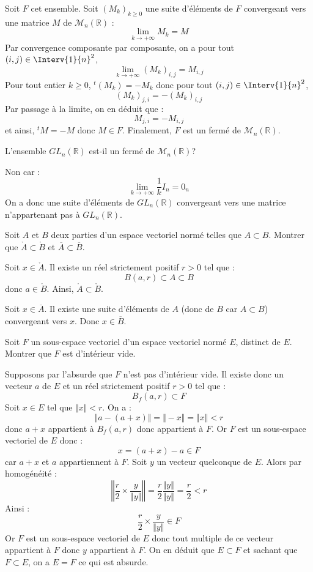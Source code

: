 \documentclass[a4paper,10pt]{report}
\begin{document}
\corr Soit $F$ cet ensemble. Soit $(M_k)_{k \geq 0}$ une suite d'éléments de $F$ convergeant vers une matrice $M$ de $\mathcal{M}_n(\mathbb{R})$ :
$$ \lim_{k \rightarrow + \infty} M_k = M$$
Par convergence composante par composante, on a pour tout $(i,j) \in \Interv{1}{n}^2$,
$$  \lim_{k \rightarrow + \infty} (M_k)_{i,j} = M_{i,j}$$
Pour tout entier $k \geq 0$, $^t(M_k)=-M_k$ donc pour tout $(i,j) \in \Interv{1}{n}^2$,
$$ (M_k)_{j,i} = - (M_k)_{i,j}$$
Par passage à la limite, on en déduit que :
$$ M_{j,i}=-M_{i,j}$$
et ainsi, $^t M=-M$ donc $M \in F$. Finalement, $F$ est un fermé de $\mathcal{M}_n(\mathbb{R})$.

\begin{Exa} L'ensemble $GL_n(\mathbb{R})$ est-il un fermé de $\mathcal{M}_n(\mathbb{R})$?
\end{Exa} 

\corr Non car :
$$ \lim_{k \rightarrow + \infty} \dfrac{1}{k} I_n = 0_n$$
On a donc une suite d'éléments de $GL_n(\mathbb{R})$ convergeant vers une matrice n'appartenant pas à $GL_n(\mathbb{R})$.


\begin{Exa} Soit $A$ et $B$ deux parties d'un espace vectoriel normé telles que $A \subset B$. Montrer que $\mathring{A} \subset \mathring{B}$ et $\overline{A} \subset \overline{B}$.
\end{Exa}

\corr Soit $x \in \mathring{A}$. Il existe un réel strictement positif $r>0$ tel que :
$$ B(a,r) \subset A \subset B$$
donc $a \in  \mathring{B}$. Ainsi, $\mathring{A} \subset \mathring{B}$.

\medskip

\noindent Soit $x \in \overline{A}$. Il existe une suite d'éléments de $A$ (donc de $B$ car $A \subset B$) convergeant vers $x$. Donc $x \in \overline{B}$.


\begin{Exa}[\ding{80}] Soit $F$ un sous-espace vectoriel d'un espace vectoriel normé $E$, distinct de $E$. Montrer que $F$ est d'intérieur vide.
\end{Exa}

\corr Supposons par l'absurde que $F$ n'est pas d'intérieur vide. Il existe donc un vecteur $a$ de $E$ et un réel strictement positif $r>0$ tel que :
$$ B_f(a,r) \subset F$$
Soit $x \in E$ tel que $\Vert x \Vert <r$. On a :
$$ \Vert a-(a+x) \Vert =  \Vert -x \Vert = \Vert x \Vert < r$$
donc $a+x$ appartient à $B_f(a,r)$ donc appartient à $F$. Or $F$ est un sous-espace vectoriel de $E$ donc :
$$ x = (a+x) -a \in F$$
car $a+x$ et $a$ appartiennent à $F$. Soit $y$ un vecteur quelconque de $E$. Alors par homogénéité :
$$ \left\Vert \dfrac{r}{2} \times \dfrac{y}{\Vert y \Vert } \right\Vert  = \dfrac{r}{2} \dfrac{\Vert y \Vert }{\Vert y \Vert } = \dfrac{r}{2} < r$$
Ainsi :
$$ \dfrac{r}{2} \times \dfrac{y}{\Vert y \Vert } \in F$$
Or $F$ est un sous-espace vectoriel de $E$ donc tout multiple de ce vecteur appartient à $F$ donc $y$ appartient à $F$. On en déduit que $E \subset F$ et sachant que $F \subset E$, on a $E=F$ ce qui est absurde.
\end{document}
